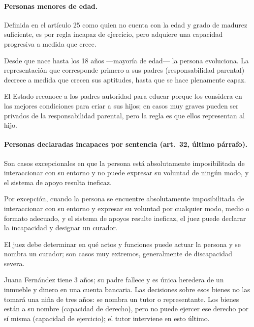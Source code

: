 \documentclass[12pt,oneside]{book}
\begin{document}
\paragraph{Personas menores de edad.} Definida en el artículo 25 como quien no cuenta con la edad y grado de madurez suficiente, es por regla incapaz de ejercicio, pero adquiere una capacidad progresiva a medida que crece.

\begin{importante}
Desde que nace hasta los 18 años ---mayoría de edad--- la persona evoluciona. La representación que corresponde primero a sus padres (responsabilidad parental) decrece a medida que crecen sus aptitudes, hasta que se hace plenamente capaz.
\end{importante}

El Estado reconoce a los padres autoridad para educar porque los considera en las mejores condiciones para criar a sus hijos; en casos muy graves pueden ser privados de la responsabilidad parental, pero la regla es que ellos representan al hijo.

\paragraph{Personas declaradas incapaces por sentencia (art.~32, último párrafo).} Son casos excepcionales en que la persona está absolutamente imposibilitada de interaccionar con su entorno y no puede expresar su voluntad de ningún modo, y el sistema de apoyo resulta ineficaz.

\begin{regla}
Por excepción, cuando la persona se encuentre absolutamente imposibilitada de interaccionar con su entorno y expresar su voluntad por cualquier modo, medio o formato adecuado, y el sistema de apoyos resulte ineficaz, el juez puede declarar la incapacidad y designar un curador.
\end{regla}

El juez debe determinar en qué actos y funciones puede actuar la persona y se nombra un curador; son casos muy extremos, generalmente de discapacidad severa.

\begin{ejemplo}
Juana Fernández tiene 3 años; su padre fallece y es única heredera de un inmueble y dinero en una cuenta bancaria. Las decisiones sobre esos bienes no las tomará una niña de tres años: se nombra un tutor o representante. Los bienes están a su nombre (capacidad de derecho), pero no puede ejercer ese derecho por sí misma (capacidad de ejercicio); el tutor interviene en esto último.
\end{ejemplo}
\end{document}
